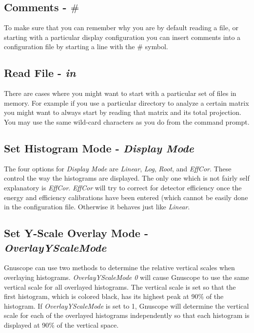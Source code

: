 \subsection{Comments - $\#$}

To make sure that you can remember why you are by default reading a file, or starting with a particular display configuration you can insert comments into a configuration file by starting a line with the $\#$ symbol.

\subsection{Read File - {\it in}}

There are cases where you might want to start with a particular set of files in memory.  For example if you use a particular directory to analyze a certain matrix you might want to always start by reading that matrix and its total projection.  You may use the same wild-card characters as you do from the command prompt.

\subsection{Set Histogram Mode - {\it Display Mode}}

The four options for {\it Display Mode} are {\it Linear}, {\it Log}, {\it Root}, and {\it EffCor}.  These control the way the histograms are displayed.  The only one which is not fairly self explanatory is {\it EffCor}.  {\it EffCor} will try to correct for detector efficiency once the energy and efficiency calibrations have been entered (which cannot be easily done in the configuration file.  Otherwise it behaves just like {\it Linear}.

\subsection{Set Y-Scale Overlay Mode - {\it OverlayYScaleMode}}

Gnuscope can use two methods to determine the relative vertical scales when overlaying histograms.  {\it OverlayYScaleMode 0} will cause Gnuscope to use the same vertical scale for all overlayed histograms.  The vertical scale is set so that the first histogram, which is colored black, has its highest peak at 90$\%$ of the histogram.  If {\it OverlayYScaleMode} is set to 1, Gnuscope will determine the vertical scale for each of the overlayed histograms independently so that each histogram is displayed at 90$\%$ of the vertical space.

